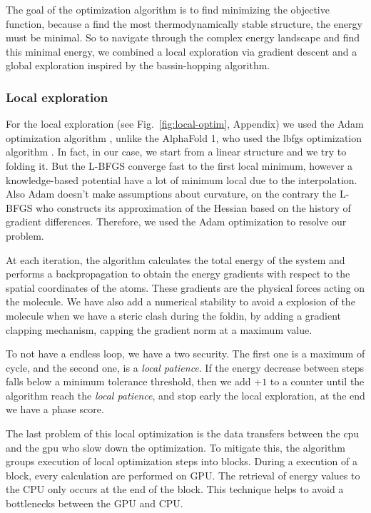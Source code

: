 \documentclass[11pt,a4paper]{article}
\begin{document}
The goal of the optimization algorithm is to find minimizing the objective function, because a find the most thermodynamically stable structure, the energy must be minimal. So to navigate through the complex energy landscape and find this minimal energy, we combined a local exploration via gradient descent and a global exploration inspired by the bassin-hopping algorithm. 

\subsubsection{Local exploration}

For the local exploration (see Fig.~\ref{fig:local-optim}, Appendix) we used the Adam optimization algorithm \cite{kingma2017adammethodstochasticoptimization}, unlike the AlphaFold 1, who used the \acrfull{lbfgs} optimization algorithm \cite{liu_limited_1989}. In fact, in our case, we start from a linear structure and we try to folding it. But the L-BFGS converge fast to the first local minimum, however a knowledge-based potential have a lot of minimum local due to the interpolation. Also Adam doesn't make assumptions about curvature, on the contrary the L-BFGS who constructs its approximation of the Hessian based on the history of gradient differences. Therefore, we used the Adam optimization to resolve our problem. 

At each iteration, the algorithm calculates the total energy of the system and performs a backpropagation to obtain the energy gradients with respect to the spatial coordinates of the atoms. These gradients are the physical forces acting on the molecule. We have also add a numerical stability to avoid a explosion of the molecule when we have a steric clash during the foldin, by adding a gradient clapping mechanism, capping the gradient norm at a maximum value. 

To not have a endless loop, we have a two security. The first one is a maximum of cycle, and the second one, is a \textit{local patience}. If the energy decrease between steps falls below a minimum tolerance threshold, then we add $+1$ to a counter until the algorithm reach the \textit{local patience}, and stop early the local exploration, at the end we have a phase score. 

The last problem of this local optimization is the data transfers between the \acrfull{cpu} and the \acrfull{gpu} who slow down the optimization. To mitigate this, the algorithm groups execution of local optimization steps into blocks. During a execution of a block, every calculation are performed on GPU. The retrieval of energy values to the CPU only occurs at the end of the block. This technique helps to avoid a bottlenecks between the GPU and CPU.
\end{document}
